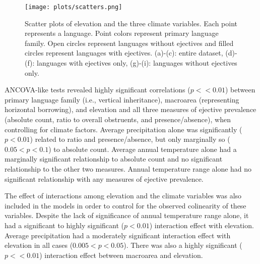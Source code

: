 \documentclass{article}
\begin{document}
\begin{figure}
	\texttt{[image: plots/scatters.png]}
	\caption{Scatter plots of elevation and the three climate variables. Each point represents a language. Point colors represent primary language family. Open circles represent languages without ejectives and filled circles represent languages with ejectives. (a)-(c): entire dataset, (d)-(f): languages with ejectives only, (g)-(i): languages without ejectives only.}
	\label{fig:scatterplots}
\end{figure}

ANCOVA-like tests revealed highly significant correlations ($p << 0.01$) between primary language family (i.e., vertical inheritance), macroarea (representing horizontal borrowing), and elevation and all three measures of ejective prevalence (absolute count, ratio to overall obstruents, and presence/absence), when controlling for climate factors. Average precipitation alone was significantly ($ p < 0.01$) related to ratio and presence/absence, but only marginally so ($0.05 < p < 0.1$) to absolute count. Average annual temperature alone had a marginally significant relationship to absolute count and no significant relationship to the other two measures. Annual temperature range alone had no significant relationship with any measures of ejective prevalence. 

The effect of interactions among elevation and the climate variables was also included in the models in order to control for the observed colinearity of these variables. Despite the lack of significance of annual temperature range alone, it had a significant to highly significant ($p < 0.01$) interaction effect with elevation. Average precipitation had a moderately significant interaction effect with elevation in all cases ($0.005 < p < 0.05$). There was also a highly significant ($p << 0.01$) interaction effect between macroarea and elevation.
\end{document}

